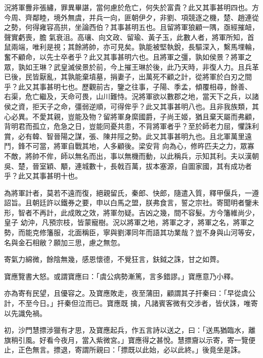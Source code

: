\begin{pinyinscope}
 況將軍釁非張繡，罪異畢諶，當何慮於危亡，何失於富貴？此又其事甚明四也。方今周、齊鄰睦，境外無虞，并兵一向，匪朝伊夕，非劉、項競逐之機，楚、趙連從之勢，何得雍容高拱，坐論西伯？其事甚明五也。且留將軍狼顧一隅，亟經摧衄，聲實虧喪，膽
 氣衰沮。高瓖、向文政、留瑜、黃子玉，此數人者，將軍所知，首鼠兩端，唯利是視；其餘將帥，亦可見矣。孰能被堅執銳，長驅深入，繫馬埋輪，奮不顧命，以先士卒者乎？此又其事甚明六也。且將軍之彊，孰如侯景？將軍之眾，孰如王琳？武皇滅侯景於前，今上摧王琳於後，此乃天時，非復人力。且兵革已後，民皆厭亂，其孰能棄墳墓，捐妻子，出萬死不顧之計，從將軍於白刃之間乎？此又其事甚明七也。歷觀前古，鑒之往事，子陽、季孟，傾覆相尋，餘善、
 右渠，危亡繼及，天命可畏，山川難恃。況將軍欲以數郡之地，當天下之兵，以諸侯之資，拒天子之命，彊弱逆順，可得侔乎？此又其事甚明八也。且非我族類，其心必異。不愛其親，豈能及物？留將軍身縻國爵，子尚王姬，猶且棄天屬而弗顧，背明君而孤立，危急之日，豈能同憂共患，不背將軍者乎？至於師老力屈，懼誅利賞，必有韓、智晉陽之謀，張、陳井陘之勢。此又其事甚明九也。且北軍萬里遠鬥，鋒不可當，將軍自戰其地，人多顧後。梁安背
 向為心，修旿匹夫之力，眾寡不敵，將帥不侔，師以無名而出，事以無機而動，以此稱兵，示知其利。夫以漢朝吳、楚，晉室穎、顒，連城數十，長戟百萬，拔本塞源，自圖家國，其有成功者乎？此又其事甚明十也。



 為將軍計者，莫若不遠而復，絕親留氏，秦郎、快郎，隨遣入質，釋甲偃兵，一遵詔旨。且朝廷許以鐵券之要，申以白馬之盟，朕弗食言，誓之宗社。寄聞明者鑒未形，智者不再計，此成敗之效，將軍勿疑。吉凶之幾，間不容髮。方今籓維尚少，皇子
 幼沖，凡預宗枝，皆蒙寵樹。況以將軍之地，將軍之才，將軍之名，將軍之勢，而能克修籓服，北面稱臣，寧與劉澤同年而語其功業哉？豈不身與山河等安，名與金石相敝？願加三思，慮之無忽。



 寄氣力綿微，餘陰無幾，感恩懷德，不覺狂言，鈇鉞之誅，甘之如薺。



 寶應覽書大怒。或謂寶應曰：「虞公病勢漸篤，言多錯謬。」寶應意乃小釋。



 亦為寄有民望，且優容之。及寶應敗走，夜至蒲田，顧謂其子扞秦曰：「早從虞公計，不至今日。」扞秦但泣而已。寶應既
 擒，凡諸賓客微有交涉者，皆伏誅，唯寄以先識免禍。



 初，沙門慧摽涉獵有才思，及寶應起兵，作五言詩以送之，曰：「送馬猶臨水，離旗稍引風。好看今夜月，當入紫微宮。」寶應得之甚悅。慧摽齎以示寄，寄一覽便止，正色無言。摽退，寄謂所親曰：「摽既以此始，必以此終。」後竟坐是誅。




\end{pinyinscope}
